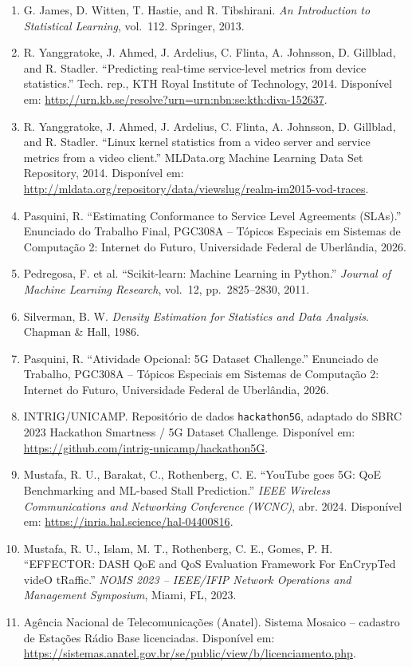 \documentclass[11pt,a4paper]{article}
\begin{document}
\begin{enumerate}[leftmargin=2em]
\item G. James, D. Witten, T. Hastie, and R. Tibshirani. \emph{An Introduction to Statistical Learning}, vol.~112. Springer, 2013.

\item R. Yanggratoke, J. Ahmed, J. Ardelius, C. Flinta, A. Johnsson, D. Gillblad, and R. Stadler. ``Predicting real-time service-level metrics from device statistics.'' Tech. rep., KTH Royal Institute of Technology, 2014. Disponível em: \url{http://urn.kb.se/resolve?urn=urn:nbn:se:kth:diva-152637}.

\item R. Yanggratoke, J. Ahmed, J. Ardelius, C. Flinta, A. Johnsson, D. Gillblad, and R. Stadler. ``Linux kernel statistics from a video server and service metrics from a video client.'' MLData.org Machine Learning Data Set Repository, 2014. Disponível em: \url{http://mldata.org/repository/data/viewslug/realm-im2015-vod-traces}.

\item Pasquini, R. ``Estimating Conformance to Service Level Agreements (SLAs).'' Enunciado do Trabalho Final, PGC308A -- Tópicos Especiais em Sistemas de Computação 2: Internet do Futuro, Universidade Federal de Uberlândia, 2026.

\item Pedregosa, F. et al. ``Scikit-learn: Machine Learning in Python.'' \emph{Journal of Machine Learning Research}, vol.~12, pp.~2825--2830, 2011.

\item Silverman, B. W. \emph{Density Estimation for Statistics and Data Analysis}. Chapman \& Hall, 1986.

\item Pasquini, R. ``Atividade Opcional: 5G Dataset Challenge.'' Enunciado de Trabalho, PGC308A -- Tópicos Especiais em Sistemas de Computação 2: Internet do Futuro, Universidade Federal de Uberlândia, 2026.

\item INTRIG/UNICAMP. Repositório de dados \texttt{hackathon5G}, adaptado do SBRC 2023 Hackathon Smartness / 5G Dataset Challenge. Disponível em: \url{https://github.com/intrig-unicamp/hackathon5G}.

\item Mustafa, R. U., Barakat, C., Rothenberg, C. E. ``YouTube goes 5G: QoE Benchmarking and ML-based Stall Prediction.'' \emph{IEEE Wireless Communications and Networking Conference (WCNC)}, abr. 2024. Disponível em: \url{https://inria.hal.science/hal-04400816}.

\item Mustafa, R. U., Islam, M. T., Rothenberg, C. E., Gomes, P. H. ``EFFECTOR: DASH QoE and QoS Evaluation Framework For EnCrypTed videO tRaffic.'' \emph{NOMS 2023 -- IEEE/IFIP Network Operations and Management Symposium}, Miami, FL, 2023.

\item Agência Nacional de Telecomunicações (Anatel). Sistema Mosaico -- cadastro de Estações Rádio Base licenciadas. Disponível em: \url{https://sistemas.anatel.gov.br/se/public/view/b/licenciamento.php}.
\end{enumerate}
\end{document}
